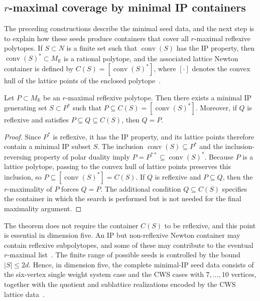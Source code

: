 \documentclass[appliedmath,article,submit,moreauthors]{Definitions/mdpi}
\newcommand{\RR}{\mathbb{R}}
\newcommand{\Conv}{\operatorname{conv}}
\begin{document}
\subsection{\texorpdfstring{\(r\)-maximal}{r-maximal} coverage by minimal IP containers}
\label{sec:math-containers}

The preceding constructions describe the minimal seed data, and the next step is
to explain how these seeds produce containers that cover all \(r\)-maximal
reflexive polytopes. If \(S\subset N\) is a finite set such that \(\Conv(S)\)
has the IP property, then \(\Conv(S)^*\subset M_{\RR}\) is a rational polytope,
and the associated lattice Newton container is defined by \(C(S)=[\Conv(S)^*]\),
where \([\cdot]\) denotes the convex hull of the lattice points of the enclosed
polytope~\cite{KS97,KSFibrations2002}.

\begin{Theorem}
\label{thm:rmaximal-pipeline}
Let \(P\subset M_{\RR}\) be an \(r\)-maximal reflexive polytope. Then there
exists a minimal IP generating set \(S\subset P^*\) such that \(P\subseteq
C(S)=[\Conv(S)^*]\). Moreover, if \(Q\) is reflexive and satisfies \(P\subseteq
Q\subseteq C(S)\), then \(Q=P\).
\end{Theorem}

\begin{proof}
Since \(P^*\) is reflexive, it has the IP property, and its lattice points
therefore contain a minimal IP subset \(S\). The inclusion \(\Conv(S)\subseteq
P^*\) and the inclusion-reversing property of polar duality imply
\(P=P^{**}\subseteq\Conv(S)^*\). Because \(P\) is a lattice polytope, passing to
the convex hull of lattice points preserves this inclusion, so
\(P\subseteq[\Conv(S)^*]=C(S)\). If \(Q\) is reflexive and \(P\subseteq Q\),
then the \(r\)-maximality of \(P\) forces \(Q=P\). The additional condition
\(Q\subseteq C(S)\) specifies the container in which the search is performed but
is not needed for the final maximality argument.
\end{proof}

The theorem does not require the container \(C(S)\) to be reflexive, and this
point is essential in dimension five. An IP but non-reflexive Newton container
may contain reflexive subpolytopes, and some of these may contribute to the
eventual \(r\)-maximal list~\cite{Skarke1996,Scholler2019}. The finite range of
possible seeds is controlled by the bound \(|S|\leq 2d\). Hence, in dimension
five, the complete minimal-IP seed data consists of the six-vertex
single weight system case and the CWS cases with \(7,\ldots,10\) vertices,
together with the quotient and sublattice realizations encoded by the CWS
lattice data~\cite{KS97,KSFibrations2002}.
\end{document}
